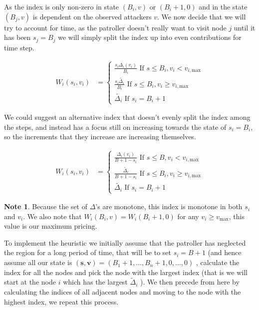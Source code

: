 \documentclass[a4paper,10pt]{article}
\theoremstyle{definition}
\theoremstyle{definition}
\theoremstyle{remark}
\theoremstyle{definition}
\newtheorem*{note}{Note}
\begin{document}
As the index is only non-zero in state $(B_{i},v)$ or $(B_{i}+1,0)$ and in the state $(B_{j},v)$ is dependent on the observed attackers $v$. We now decide that we will try to account for time, as the patroller doesn't really want to visit node $j$ until it has been $s_{j}=B_{j}$ we will simply split the index up into even contributions for time step.

\begin{align}
W_{i}(s_{i},v_{i})&=\begin{cases}
\frac{s_{i} \Delta_{i}(v_{i})}{B_{i}} \text{ If } s \leq B_{i},v_{i}<v_{i,\text{max}} \\
\frac{s_{i} \widetilde{\Delta_{i}}}{B_{i}} \text{ If } s \leq B_{i},v_{i} \geq v_{i,\text{max}} \\
\widetilde{\Delta_{i}} \text{ If } s_{i}=B_{i}+1
\end{cases}
\end{align}

We could suggest an alternative index that doesn't evenly split the index among the steps, and instead has a focus still on increasing towards the state of $s_{i}=B_{i}$, so the increments that they increase are increasing themselves.

\begin{align}
W_{i}(s_{i},v_{i})&=\begin{cases}
\frac{\Delta_{i}(v_{i})}{B+1-s_{i}} \text{ If } s \leq B,v_{i}<v_{i,\text{max}} \\
\frac{\widetilde{\Delta_{i}}}{B+1-s_{i}} \text{ If } s \leq B_{i},v_{i} \geq v_{i,\text{max}} \\
\widetilde{\Delta_{i}} \text{ If } s_{i}=B_{i}+1
\end{cases}
\end{align}



\begin{note}
Because the set of $\Delta$'s are monotone, this index is monotone in both $s_{i}$ and $v_{i}$. We also note that $W_{i}(B_{i},v)=W_{i}(B_{i}+1,0)$ for any $v_{i} \geq v_{\text{max}}$, this value is our maximum pricing.
\end{note}

To implement the heuristic we initially assume that the patroller has neglected the region for a long period of time, that will be to set $s_{i}=B+1$ (and hence assume all our state is $(\bm{s},\bm{v})=(B_{1}+1,...,B_{n}+1,0,...,0)$ , calculate the index for all the nodes and pick the node with the largest index (that is we will start at the node $i$ which has the largest $\widetilde{\Delta}_{i}$ ).
We then precede from here by calculating the indices of all adjacent nodes and moving to the node with the highest index, we repeat this process.
\end{document}
